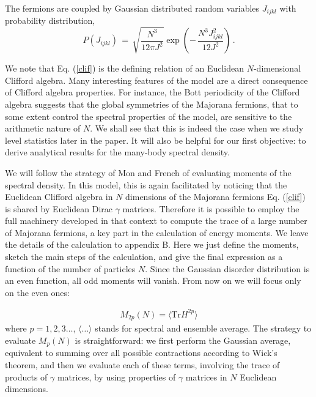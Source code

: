 \documentclass[aps,showpacs,floatfix,superscriptaddress,pre,11pt]{revtex4-1}
\newcommand{\Tr}{\rm Tr}
\def\Tr{\textrm{Tr}}
\begin{document}
 The fermions are coupled by Gaussian distributed random variables  $J_{ijkl}$
 with probability distribution,
 \begin{equation}
 P(J_{ijkl}) \, = \, \sqrt{\frac{N^3}{12 \pi J^2}} \exp\left( - \, \frac{N^3J_{ijkl}^2}{12J^2} \right) \, .
 \end{equation}


 We note that Eq. (\ref{clif}) is the defining relation of an Euclidean $N$-dimensional Clifford algebra. Many interesting features of the model are a direct consequence of Clifford algebra properties. For instance, the Bott periodicity of the Clifford algebra suggests that the global symmetries of the Majorana fermions, that to some extent control the spectral properties of the model, are sensitive to the arithmetic nature of $N$. We shall see that this is indeed the case when we study level statistics later in the paper.  
 It will also be helpful for our first objective: to derive analytical results for
 the many-body spectral density.

 We will follow the strategy of Mon and French \cite{mon1975} of evaluating  moments of the spectral density. In this model, this is again facilitated by noticing that the Euclidean Clifford algebra in $N$ dimensions of the Majorana fermions Eq. (\ref{clif}) is shared by Euclidean Dirac $\gamma$ matrices. Therefore it is possible to employ the full machinery developed in that context to compute the trace of a large number of Majorana fermions, a key part in the calculation of energy moments. We leave the details of the calculation to  appendix B. Here we just define the moments, sketch the main steps of the calculation, and give the %
 final expression as a function of the number of particles $N$. Since the Gaussian disorder distribution is an even function, all odd moments will vanish. From now on we will focus only on the even ones:
 
 \begin{eqnarray}
 M_{2p}(N)= \langle \Tr H^{2p}\rangle \label{moment}
 \end{eqnarray}
 where $p = 1,2,3 \ldots$, $\langle \ldots \rangle$ stands for spectral and ensemble average.  
 The strategy to evaluate $M_p(N)$ is straightforward: we first
 perform the Gaussian average, equivalent to summing over
 all possible contractions according
 to Wick's theorem, and then we evaluate each of these terms, involving the trace of products of $\gamma$ matrices, by using properties of $\gamma$ matrices in $N$ Euclidean dimensions. 
\end{document}
